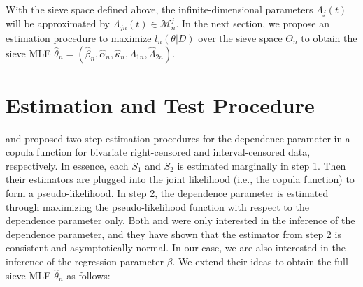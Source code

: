 With the sieve space defined above, the infinite-dimensional parameters $\Lambda_j(t)$  will be approximated by $\Lambda_{jn}(t) \in \mathcal{M}_n^j$. In the next section, we propose an estimation procedure to maximize $l_n(\theta|D)$ over the sieve space $\Theta_n$ to obtain the sieve MLE $\hat{\theta}_n = (\hat{\beta}_n, \hat{\alpha}_n, \hat{\kappa}_n, \hat{\Lambda}_{1n}, \hat{\Lambda}_{2n})$.


\section{Estimation and Test Procedure}
\citet{two_stage_right_censor} and \citet{two_stage_interval_censor} proposed two-step estimation procedures for the dependence parameter in a copula function for bivariate right-censored and interval-censored data, respectively. In essence, each $S_1$ and $S_2$ is estimated marginally in step 1. Then their estimators are plugged into the joint likelihood (i.e., the copula function) to form a pseudo-likelihood. In step 2, the dependence parameter is estimated through maximizing the pseudo-likelihood function with respect to the dependence parameter only. Both \citet{two_stage_right_censor} and \citet{two_stage_interval_censor} were only interested in the inference of the dependence parameter, and they have shown that the estimator from step 2 is consistent and asymptotically normal. In our case, we are also interested in the inference of the regression parameter $\beta$. We extend their ideas to obtain the full sieve MLE $\hat{\theta}_n$ as follows:
